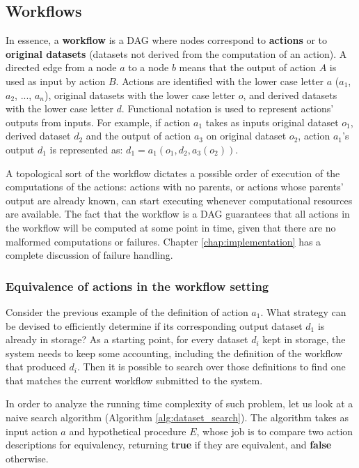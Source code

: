 \subsection{Workflows}
In essence, a \textbf{workflow} is a DAG where nodes correspond to \textbf{actions} or to \textbf{original datasets} (datasets not derived from the computation of an action). A directed edge from a node $a$ to a node $b$ means that the output of action $A$ is used as input by action $B$.  Actions are identified with the lower case letter $a$ ($a_1$, $a_2$, ..., $a_n$), original datasets with the lower case letter $o$, and derived datasets with the lower case letter $d$.  Functional notation is used to represent actions' outputs from inputs.  For example, if action $a_1$ takes as inputs original dataset $o_1$, derived dataset $d_2$ and the output of action $a_3$ on original dataset $o_2$, action $a_1$'s output $d_1$ is represented as: $d_1 = a_1(o_1, d_2, a_3(o_2))$.

A topological sort of the workflow dictates a possible order of execution of the computations of the actions: actions with no parents, or actions whose parents' output are already known, can start executing whenever computational resources are available. The fact that the workflow is a DAG guarantees that all actions in the workflow will be computed at some point in time, given that there are no malformed computations or failures.  Chapter \ref{chap:implementation} has a complete discussion of failure handling.

\subsubsection{Equivalence of actions in the workflow setting}
Consider the previous example of the definition of action $a_1$. What strategy can be devised to efficiently determine if its corresponding output dataset $d_1$ is already in storage? As a starting point, for every dataset $d_i$ kept in storage, the system needs to keep some accounting, including the definition of the workflow that produced $d_i$.  Then it is possible to search over those definitions to find one that matches the current workflow submitted to the system.  

In order to analyze the running time complexity of such problem, let us look at a naive search algorithm (Algorithm \ref{alg:dataset_search}). The algorithm takes as input action $a$ and hypothetical procedure $E$, whose job is to compare two action descriptions for equivalency, returning \textbf{true} if they are equivalent, and \textbf{false} otherwise.


